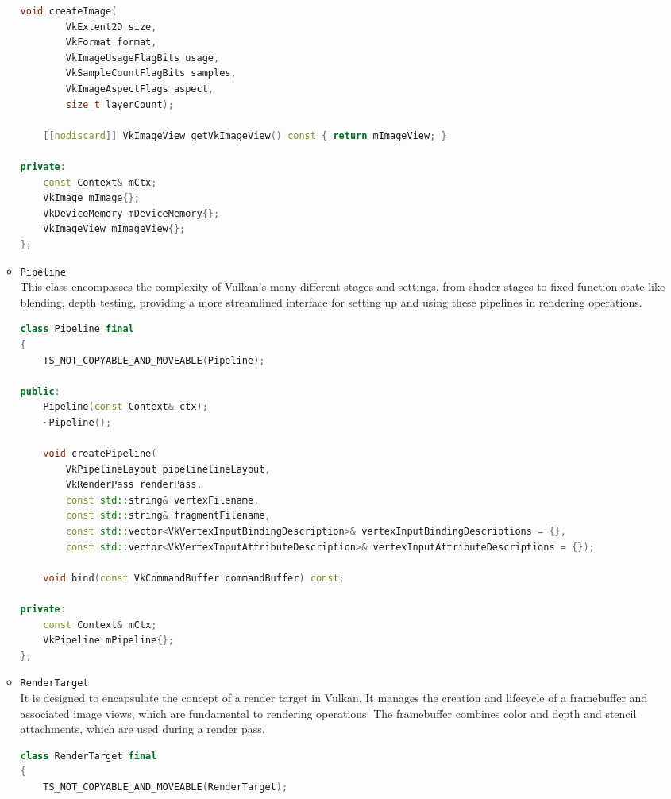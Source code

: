 \begin{itemize}
\begin{itemize}
\begin{lstlisting}[language=c++, caption=\texttt{ImageBuffer} class (./engine/src/core/image\_buffer.h)]
    void createImage(
        VkExtent2D size,
        VkFormat format,
        VkImageUsageFlagBits usage,
        VkSampleCountFlagBits samples,
        VkImageAspectFlags aspect,
        size_t layerCount);

    [[nodiscard]] VkImageView getVkImageView() const { return mImageView; }

private:
    const Context& mCtx;
    VkImage mImage{};
    VkDeviceMemory mDeviceMemory{};
    VkImageView mImageView{};
};
\end{lstlisting}
    \item \texttt{Pipeline}\\
    This class encompasses the complexity of Vulkan's many different stages and settings, from shader stages to fixed-function state like blending, depth testing, providing a more streamlined interface for setting up and using these pipelines in rendering operations.
\begin{lstlisting}[language=c++, caption=\texttt{Pipeline} class (./engine/src/core/pipeline.h)]
class Pipeline final
{
    TS_NOT_COPYABLE_AND_MOVEABLE(Pipeline);

public:
    Pipeline(const Context& ctx);
    ~Pipeline();

    void createPipeline(
        VkPipelineLayout pipelinelineLayout,
        VkRenderPass renderPass,
        const std::string& vertexFilename,
        const std::string& fragmentFilename,
        const std::vector<VkVertexInputBindingDescription>& vertexInputBindingDescriptions = {},
        const std::vector<VkVertexInputAttributeDescription>& vertexInputAttributeDescriptions = {});

    void bind(const VkCommandBuffer commandBuffer) const;

private:
    const Context& mCtx;
    VkPipeline mPipeline{};
};
\end{lstlisting}
    \item \texttt{RenderTarget}\\
    It is designed to encapsulate the concept of a render target in Vulkan. It manages the creation and lifecycle of a framebuffer and associated image views, which are fundamental to rendering operations. The framebuffer combines color and depth and stencil attachments, which are used during a render pass.
\begin{lstlisting}[language=c++, caption=\texttt{RenderTarget} class (./engine/src/core/render\_target.h)]
class RenderTarget final
{
    TS_NOT_COPYABLE_AND_MOVEABLE(RenderTarget);


\end{lstlisting}
\end{itemize}
\end{itemize}
